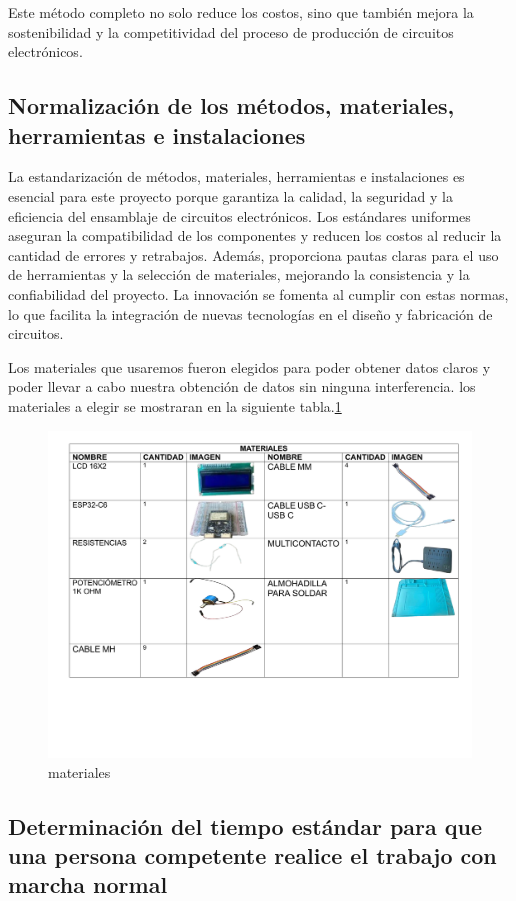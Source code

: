     Este método completo no solo reduce los costos, sino que también mejora la sostenibilidad y la competitividad del proceso de producción de circuitos electrónicos.
    \subsection{Normalización de los métodos, materiales, herramientas e instalaciones}
    La estandarización de métodos, materiales, herramientas e instalaciones es esencial para este proyecto porque garantiza la calidad, la seguridad y la eficiencia del ensamblaje de circuitos electrónicos. Los estándares uniformes aseguran la compatibilidad de los componentes y reducen los costos al reducir la cantidad de errores y retrabajos. Además, proporciona pautas claras para el uso de herramientas y la selección de materiales, mejorando la consistencia y la confiabilidad del proyecto. La innovación se fomenta al cumplir con estas normas, lo que facilita la integración de nuevas tecnologías en el diseño y fabricación de circuitos.
    
    Los materiales que usaremos fueron elegidos para poder obtener datos claros y poder llevar a cabo nuestra obtención de datos sin ninguna interferencia. los materiales a elegir se mostraran en la siguiente tabla.\ref{fig:materiales}
    \begin{figure}[H]
        \centering
        \includegraphics[scale=0.30]{13/img/materiales.pdf}
        \caption{materiales}
        \label{fig:materiales}
    \end{figure}
    \subsection{Determinación del tiempo estándar para que una persona competente realice el trabajo con marcha normal}
    
